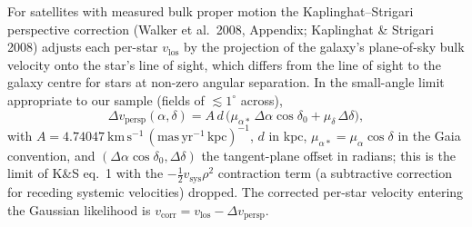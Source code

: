 \documentclass[11pt]{article}
\begin{document}
For satellites with measured bulk proper motion the Kaplinghat--Strigari
perspective correction (Walker et al.\ 2008, Appendix; Kaplinghat \&
Strigari 2008) adjusts each per-star $v_\mathrm{los}$ by the projection
of the galaxy's plane-of-sky bulk velocity onto the star's line of
sight, which differs from the line of sight to the galaxy centre for
stars at non-zero angular separation.  In the small-angle limit
appropriate to our sample (fields of $\lesssim 1^\circ$ across),
\begin{equation}
\label{eq:persp}
\Delta v_\mathrm{persp}(\alpha,\delta) = A\,d\,\bigl(\mu_{\alpha\ast}\,\Delta\alpha\cos\delta_0 + \mu_\delta\,\Delta\delta\bigr),
\end{equation}
with $A = 4.74047~\mathrm{km\,s^{-1}}\,(\mathrm{mas\,yr^{-1}\,kpc})^{-1}$,
$d$ in kpc, $\mu_{\alpha\ast} = \mu_\alpha\cos\delta$ in the Gaia
convention, and $(\Delta\alpha\cos\delta_0,\Delta\delta)$ the tangent-plane
offset in radians; this is the limit of K\&S eq.~1 with the
$-\tfrac{1}{2}v_\mathrm{sys}\rho^2$ contraction term (a subtractive
correction for receding systemic velocities) dropped.  The
corrected per-star velocity entering the Gaussian likelihood is
$v_\mathrm{corr} = v_\mathrm{los} - \Delta v_\mathrm{persp}$.
\end{document}
